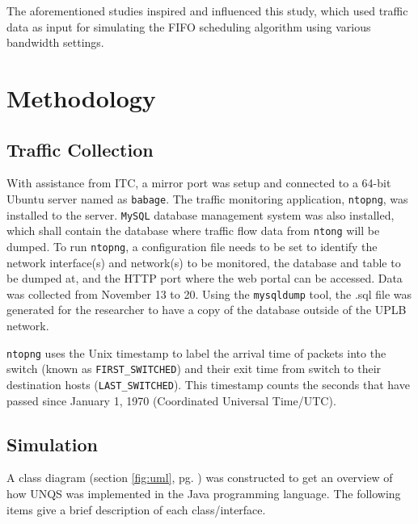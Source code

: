\documentclass[journal]{IEEE/IEEEtran}
\begin{document}
The aforementioned studies inspired and influenced this study, which used traffic data as input for simulating the FIFO scheduling algorithm using various bandwidth settings.%

\section{Methodology}
\subsection{Traffic Collection}
With assistance from ITC, a mirror port was setup and connected to a 64-bit Ubuntu server named as \texttt{babage}. The traffic monitoring application, \texttt{ntopng}, was installed to the server. \texttt{MySQL} database management system was also installed, which shall contain the database where traffic flow data from \texttt{ntong} will be dumped. To run \texttt{ntopng}, a configuration file needs to be set to identify the network interface(s) and network(s) to be monitored, the database and table to be dumped at, and the HTTP port where the web portal can be accessed. Data was collected from November 13 to 20. Using the \texttt{mysqldump} tool, the .sql file was generated for the researcher to have a copy of the database outside of the UPLB network. 

\texttt{ntopng} uses the Unix timestamp to label the arrival time of packets into the switch (known as \texttt{FIRST\_SWITCHED}) and their exit time from switch to their destination hosts (\texttt{LAST\_SWITCHED}). This timestamp counts the seconds that have passed since January 1, 1970 (Coordinated Universal Time/UTC).

\subsection{Simulation}

A class diagram (section \ref{fig:uml}, pg. \pageref{fig:uml}) was constructed to get an overview of how UNQS was implemented in the Java programming language. The following items give a brief description of each class/interface.
\end{document}
